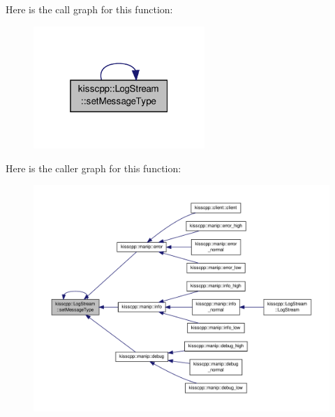 Here is the call graph for this function\-:
\nopagebreak
\begin{figure}[H]
\begin{center}
\leavevmode
\includegraphics[width=184pt]{classkisscpp_1_1_log_stream_adf597c630a454a9a84be5f2b0ade08af_cgraph}
\end{center}
\end{figure}




Here is the caller graph for this function\-:
\nopagebreak
\begin{figure}[H]
\begin{center}
\leavevmode
\includegraphics[width=350pt]{classkisscpp_1_1_log_stream_adf597c630a454a9a84be5f2b0ade08af_icgraph}
\end{center}
\end{figure}


